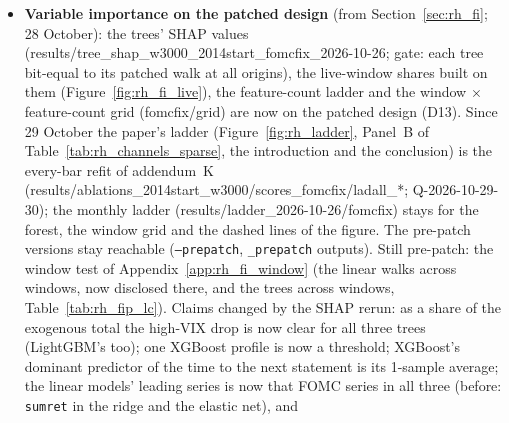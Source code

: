 \begin{itemize}
\begin{itemize}
    closing-interval model set, so check that no appendix statistic still runs over it. The pooled MinGRU stays
    parked. %
  \item \textbf{Variable importance on the patched design} (from Section~\ref{sec:rh_fi}; 28 October): the trees'
    SHAP values (results/tree\_shap\_w3000\_2014start\_fomcfix\_2026-10-26; gate: each tree bit-equal to its patched
    walk at all \rhfipNOrigins{} origins), the live-window shares built on them (Figure~\ref{fig:rh_fi_live}), the
    feature-count ladder and the window $\times$ feature-count grid (fomcfix/grid) are now on the patched design
    (D13). Since 29 October the paper's ladder (Figure~\ref{fig:rh_ladder}, Panel~B of
    Table~\ref{tab:rh_channels_sparse}, the introduction and the conclusion) is the every-bar refit of addendum~K
    (results/ablations\_2014start\_w3000/scores\_fomcfix/ladall\_*; Q-2026-10-29-30); the monthly ladder
    (results/ladder\_2026-10-26/fomcfix) stays for the forest, the window grid and the dashed lines of the figure.
    The pre-patch versions stay reachable
    (\texttt{--prepatch}, \texttt{\_prepatch} outputs). Still pre-patch: the window test of
    Appendix~\ref{app:rh_fi_window} (the linear walks across windows, now disclosed there, and the trees across
    windows, Table~\ref{tab:rh_fip_lc}). Claims changed by the SHAP rerun: as a share of the exogenous total the
    high-VIX drop is now clear for all three trees (LightGBM's too); one XGBoost profile is now a threshold; XGBoost's
    dominant predictor of the time to the next statement is its 1-sample average; the linear models' leading series
    is now that FOMC series in all three (before: \texttt{sumret} in the ridge and the elastic net), and

\end{itemize}
\end{itemize}
